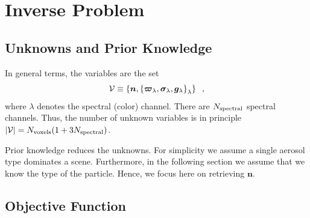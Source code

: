 \documentclass[10pt,letterpaper]{article}
\newcommand{\vect}[1]{\bm{#1}}
\begin{document}

\section{Inverse Problem}
\label{sec:inverse-problem}


\subsection{Unknowns and Prior Knowledge}
\label{sec:prior}

In general terms, the variables are the set
\begin{equation}
  {\cal V}\equiv
  \left\{
    {\bm n},
    \left\{
      \vect{\varpi}_{\lambda},\vect{\sigma}_{\lambda},{\bm g}_{\lambda}
    \right\}_{\lambda}
  \right\}
  \;\;,
  \label{eq:calV}
\end{equation}
where $\lambda$ denotes the spectral (color) channel.  There are
$N_{\rm spectral}$ spectral channels.  Thus, the number of unknown
variables is in principle \mbox{$|{\cal V}|=N_{\rm voxels}(1+3N_{\rm
    spectral})$}.

Prior knowledge reduces the unknowns. For simplicity we assume a
single aerosol type dominates a scene. Furthermore, in the following
section we assume that we know the type of the particle. Hence, we
focus here on retrieving ${\bm n}$.


\subsection{Objective Function}
\label{sec:objective-function}
\end{document}
